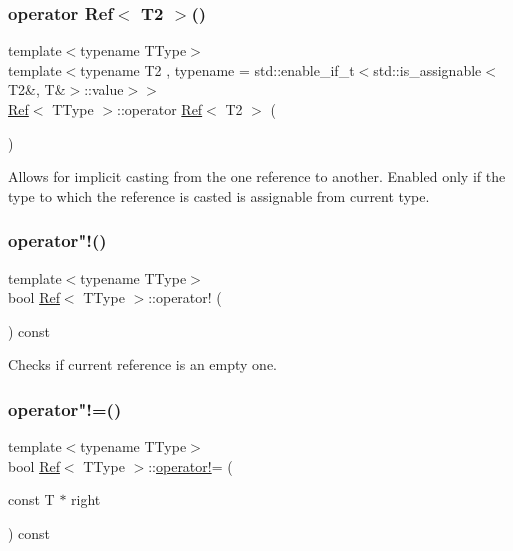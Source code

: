 \subsubsection{\texorpdfstring{operator Ref$<$ T2 $>$()}{operator Ref< T2 >()}\hspace{0.1cm}{\footnotesize\ttfamily [2/2]}}
{\footnotesize\ttfamily template$<$typename T\+Type$>$ \\
template$<$typename T2 , typename  = std\+::enable\+\_\+if\+\_\+t$<$std\+::is\+\_\+assignable$<$\+T2\&, T\&$>$\+::value$>$$>$ \\
\mbox{\hyperlink{class_ref}{Ref}}$<$ T\+Type $>$\+::operator \mbox{\hyperlink{class_ref}{Ref}}$<$ T2 $>$ (\begin{DoxyParamCaption}{ }\end{DoxyParamCaption})\hspace{0.3cm}{\ttfamily [inline]}}



Allows for implicit casting from the one reference to another. Enabled only if the type to which the reference is casted is assignable from current type. 

\mbox{\label{class_ref_aed42f0368b0f72de67c391a731392154}} 
\subsubsection{\texorpdfstring{operator"!()}{operator!()}}
{\footnotesize\ttfamily template$<$typename T\+Type$>$ \\
bool \mbox{\hyperlink{class_ref}{Ref}}$<$ T\+Type $>$\+::operator! (\begin{DoxyParamCaption}{ }\end{DoxyParamCaption}) const\hspace{0.3cm}{\ttfamily [inline]}}



Checks if current reference is an empty one. 

\mbox{\label{class_ref_a8970ca9149b48f6c77527f38c2a5e054}} 
\subsubsection{\texorpdfstring{operator"!=()}{operator!=()}}
{\footnotesize\ttfamily template$<$typename T\+Type$>$ \\
bool \mbox{\hyperlink{class_ref}{Ref}}$<$ T\+Type $>$\+::\mbox{\hyperlink{class_ref_aed42f0368b0f72de67c391a731392154}{operator!}}= (\begin{DoxyParamCaption}\item[{const T $\ast$}]{right }\end{DoxyParamCaption}) const\hspace{0.3cm}{\ttfamily [inline]}}



